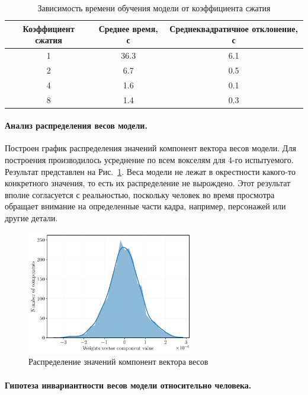 \begin{table}[h!]
	\centering
	\caption{Зависимость времени обучения модели от коэффициента сжатия}
	\begin{tabular}{|c|c|c|}
		\hline
		Коэффициент сжатия & Среднее время, с & Среднеквадратичное отклонение, с \\ \hline \hline
		1 & 36.3 & 6.1 \\ \hline
		2 & 6.7 & 0.5 \\ \hline
		4 & 1.6 & 0.1 \\ \hline
		8 & 1.4 & 0.3 \\ \hline
	\end{tabular}
	\label{table:coeffs}
\end{table}

\paragraph*{Анализ распределения весов модели.}

Построен график распределения значений компонент вектора весов модели.
Для построения производилось усреднение по всем вокселям для 4-го испытуемого.
Результат представлен на Рис.~\ref{fig:w-distr}.
Веса модели не лежат в окрестности какого-то конкретного значения, 
то есть их распределение не вырождено.
Этот результат вполне согласуется с реальностью, поскольку человек во время просмотра
обращает внимание на определенные части кадра, например, персонажей или
другие детали.

\begin{figure}[h!]
	\centering
	\includegraphics[width=0.65\textwidth]{images/fmri_forecasting/distribution.pdf}
	\caption{Распределение значений компонент вектора весов}
	\label{fig:w-distr}
\end{figure}

\paragraph*{Гипотеза инвариантности весов модели относительно человека.}

